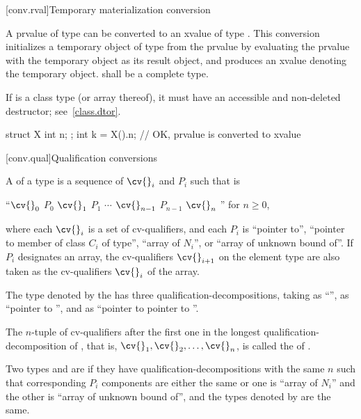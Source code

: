 [conv.rval]{Temporary materialization conversion}
%

\pnum
A prvalue of type  can be converted to an xvalue of type .
This conversion initializes a temporary object of type  from the prvalue
by evaluating the prvalue with the temporary object as its result object,
and produces an xvalue denoting the temporary object.
 shall be a complete type.
\begin{note}
If  is a class type (or array thereof),
it must have an accessible and non-deleted destructor;
see~\ref{class.dtor}.
\end{note}
\begin{example}
\begin{codeblock}
struct X { int n; };
int k = X().n;      // OK,  prvalue is converted to xvalue
\end{codeblock}
\end{example}

[conv.qual]{Qualification conversions}

%
\pnum
A  of a type 
is a sequence of
$\cv{}_i$ and $P_i$
such that  is
\begin{indented}
``$\cv{}_0$ $P_0$ $\cv{}_1$ $P_1$ $\cdots$ $\cv{}_{n-1}$ $P_{n-1}$ $\cv{}_n$ '' for $n \geq 0$,
\end{indented}
where
each $\cv{}_i$ is a set of cv-qualifiers, and
each $P_i$ is
``pointer to'',
``pointer to member of class $C_i$ of type'',
``array of $N_i$'', or
``array of unknown bound of''.
If $P_i$ designates an array,
the cv-qualifiers $\cv{}_{i+1}$ on the element type are also taken as
the cv-qualifiers $\cv{}_i$ of the array.
\begin{example}
The type denoted by the  
has three qualification-decompositions,
taking 
as ``'',
as ``pointer to '', and
as ``pointer to pointer to ''.
\end{example}
The $n$-tuple of cv-qualifiers after the first one
in the longest qualification-decomposition of , that is,
$\cv{}_1, \cv{}_2, \dotsc, \cv{}_n$, is called the
 of .

\pnum
{}%
Two types  and  are  if
they have qualification-decompositions with the same $n$
such that corresponding $P_i$ components are either the same
or one is ``array of $N_i$'' and the other is ``array of unknown bound of'',
and the types denoted by  are the same.

